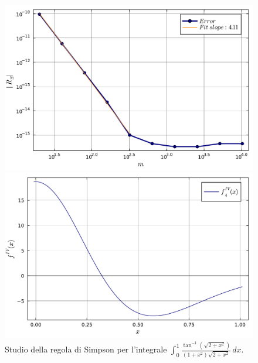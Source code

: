 \documentclass[letterpaper, 12pt]{article}
\numberwithin{equation}{section}    %
\begin{document}
\begin{figure}[!ht]
    \centering
    \begin{minipage}[b]{0.42\textwidth}
        \includegraphics[width=\textwidth]{5144.pdf}
    \end{minipage}
    \hspace{0.5cm}
    \begin{minipage}[b]{0.42\textwidth}
        \includegraphics[width=\textwidth]{5144_2.pdf}
    \end{minipage}
    \caption{Studio della regola di Simpson per l'integrale $\int_0^1 \frac{\tan^{-1}(\sqrt{2+x^2})}{(1+x^2)\sqrt{2+x^2}}\,dx$.}
    \label{fig:es5_1_4_4}
\end{figure}
\end{document}
